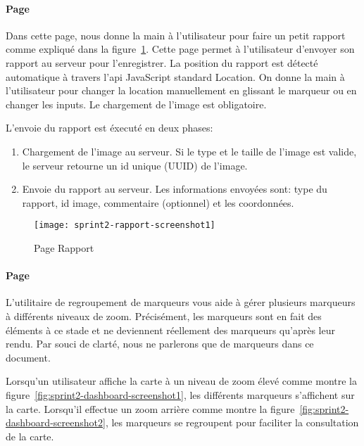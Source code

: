 \paragraph{Page }

Dans cette page, nous donne la main à l'utilisateur pour faire un petit rapport
comme expliqué dans la figure~\ref{fig:sprint2-rapport-screenshot1}.
Cette page permet à l'utilisateur d'envoyer son rapport au serveur pour
l'enregistrer.
La position du rapport est détecté automatique à travers l'api JavaScript
standard Location. On donne la main à l'utilisateur pour changer la location
manuellement en glissant le marqueur ou en changer les inputs.
Le chargement de l'image est obligatoire.

L'envoie du rapport est éxecuté en deux phases:
\begin{enumerate}
    \item Chargement de l'image au serveur. Si le type et le taille de l'image
        est valide, le serveur retourne un id unique (UUID) de l'image.
    \item Envoie du rapport au serveur. Les informations envoyées sont: type du rapport, id image, commentaire (optionnel) et les coordonnées.
\end{enumerate}

\begin{figure}[htbp]
  \centering
  \texttt{[image: sprint2-rapport-screenshot1]}
  \caption{Page Rapport}
  \label{fig:sprint2-rapport-screenshot1}
\end{figure}
\paragraph{Page }
L'utilitaire de regroupement de marqueurs vous aide à gérer plusieurs marqueurs à différents niveaux de zoom.
Précisément, les  marqueurs  sont en fait des éléments à ce stade et ne deviennent réellement des
marqueurs qu'après leur rendu. Par souci de clarté, nous ne parlerons que de marqueurs 
dans ce document.

Lorsqu'un utilisateur affiche la carte à un niveau de zoom élevé comme montre la
figure~\ref{fig:sprint2-dashboard-screenshot1}, les différents marqueurs
s'affichent sur la carte. Lorsqu'il effectue un zoom arrière comme montre la
figure~\ref{fig:sprint2-dashboard-screenshot2}, les marqueurs se regroupent pour faciliter la consultation de la carte.

